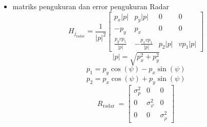 \begin{frame}[allowframebreaks]
\begin{itemize}
\begin{equation}
            \label{eq: 2-LREKF-HQ}
        \end{equation}
        \item matriks pengukuran dan error pengukuran Radar
        \begin{equation}
            H_{j_{\mathrm{radar}}}=\frac{1}{|p|^{2}}\left[\begin{array}{cccc}
            p_{x}|p| & p_{y}|p| & 0 & 0 \\
            -p_{y} & p_{x} & 0 & 0 \\
            \frac{p_{y} v p_{1}}{|p|} & -\frac{p_{x} v p_{1}}{|p|} & p_{2}|p| & v p_{1}|p|
            \end{array}\right]
        \end{equation}
        $$
        |p|=\sqrt{p_{x}^{2}+p_{y}^{2}}
        $$
        $$
        p_{1}=p_{y} \cos (\psi)-p_{x} \sin (\psi)
        $$
        $$
        p_{2}=p_{x} \cos (\psi)+p_{y} \sin (\psi)
        $$
        \begin{equation}
            R_{\text {radar }}=\left[\begin{array}{ccc}
            \sigma_{p}^{2} & 0 & 0 \\
            0 & \sigma_{\varphi}^{2} & 0 \\
            0 & 0 & \sigma_{\dot{\rho}}^{2}
            \end{array}\right]
        \end{equation}
    \end{itemize}

\end{frame}